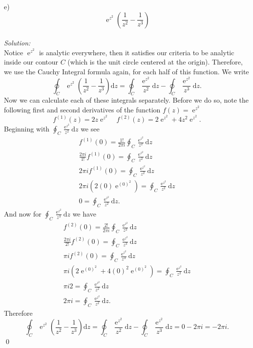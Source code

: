 \documentclass[10pt]{amsart}
\newcommand{\D}{\mathrm{d}}
\DeclareMathOperator{\E}{e}
\theoremstyle{nonumberplain}
\begin{document}
\begin{enumerate}[label={\bf {\arabic*}:}]
e)
$$
\E^{z^2}\left(\frac{1}{z^2} - \frac{1}{z^3}\right)
$$
\\
\textit{Solution:}\\
Notice $\E^{z^2}$ is analytic everywhere, then it satisfies our criteria to be analytic inside our contour $C$ (which is the unit circle centered at the origin).
Therefore, we use the Cauchy Integral formula again, for each half of this function.
We write
$$
\oint_C \E^{z^2}\left(\frac{1}{z^2} - \frac{1}{z^3}\right) \D z
	= \oint_C \frac{\E^{z^2}}{z^2}\D z - \oint_C \frac{\E^{z^2}}{z^3} \D z.
$$
Now we can calculate each of these integrals separately.
Before we do so, note the following first and second derivatives of the function $f(z) = \E^{z^2}$
$$f^{(1)}(z) = 2z\E^{z^2} \quad f^{(2)}(z) = 2\E^{z^2} + 4z^2\E^{z^2}.$$
Beginning with $\oint_C \frac{\E^{z^2}}{z^2}\D z$ we see
\begin{align*}
f^{(1)}(0) = \frac{1!}{2\pi i} \oint_C \frac{\E^{z^2}}{z^2}\D z \\
\frac{2\pi i}{1!} f^{(1)}(0) = \oint_C \frac{\E^{z^2}}{z^2}\D z \\
2\pi i f^{(1)}(0) = \oint_C \frac{\E^{z^2}}{z^2}\D z \\
2\pi i\left( 2(0)\E^{(0)^2}\right) = \oint_C \frac{\E^{z^2}}{z^2}\D z \\
0 = \oint_C \frac{\E^{z^2}}{z^2}\D z.
\end{align*}
And now for $\oint_C \frac{\E^{z^2}}{z^3} \D z$ we have
\begin{align*}
f^{(2)}(0) = \frac{2!}{2\pi i} \oint_C \frac{\E^{z^2}}{z^3}\D z \\
\frac{2\pi i}{2!} f^{(2)}(0) = \oint_C \frac{\E^{z^2}}{z^3}\D z \\
\pi i f^{(2)}(0) = \oint_C \frac{\E^{z^2}}{z^3}\D z \\
\pi i \left(2\E^{(0)^2} + 4(0)^2\E^{(0)^2}\right) = \oint_C \frac{\E^{z^2}}{z^2}\D z \\
\pi i 2 = \oint_C \frac{\E^{z^2}}{z^2}\D z \\
2 \pi i = \oint_C \frac{\E^{z^2}}{z^2}\D z.
\end{align*}
Therefore
$$
\oint_C \E^{z^2}\left(\frac{1}{z^2} - \frac{1}{z^3}\right) \D z
	= \oint_C \frac{\E^{z^2}}{z^2}\D z - \oint_C \frac{\E^{z^2}}{z^3} \D z
	= 0 - 2 \pi i = - 2 \pi i.
$$
\qed
\end{enumerate}
\end{document}

